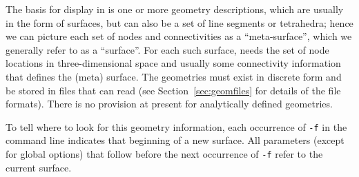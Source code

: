 The basis for display in \map{} is one or more geometry descriptions,
which are usually in the form of surfaces, but can also be a set of line
segments or tetrahedra; hence we can picture each set of nodes and
connectivities as a ``meta-surface'', which we generally refer to as a
``surface''.  For each such surface, \map{} needs the set of node locations
in three-dimensional space and usually some connectivity information that
defines the (meta) surface.  The geometries must exist in discrete form and
be stored in files that \map{} can read (see Section~\ref{sec:geomfiles} for
details of the file formats).  There is no provision at present for
analytically defined geometries.

To tell \map{} where to look for this geometry information, 
each occurrence of \texttt{-f} in the command line indicates that 
beginning of a new surface.  All parameters (except for global options)
that follow before the 
next occurrence of \texttt{-f} refer to the current surface.
%
